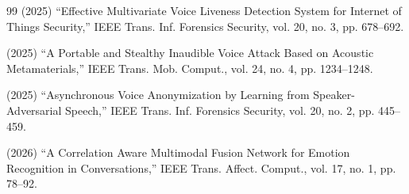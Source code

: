 \documentclass{article}
\begin{document}
\begin{thebibliography}{99}
 (2025) ``Effective Multivariate Voice Liveness Detection System for Internet of Things Security,'' IEEE Trans. Inf. Forensics Security, vol. 20, no. 3, pp. 678--692.

 (2025) ``A Portable and Stealthy Inaudible Voice Attack Based on Acoustic Metamaterials,'' IEEE Trans. Mob. Comput., vol. 24, no. 4, pp. 1234--1248.

 (2025) ``Asynchronous Voice Anonymization by Learning from Speaker-Adversarial Speech,'' IEEE Trans. Inf. Forensics Security, vol. 20, no. 2, pp. 445--459.

 (2026) ``A Correlation Aware Multimodal Fusion Network for Emotion Recognition in Conversations,'' IEEE Trans. Affect. Comput., vol. 17, no. 1, pp. 78--92.

\end{thebibliography}
\end{document}
